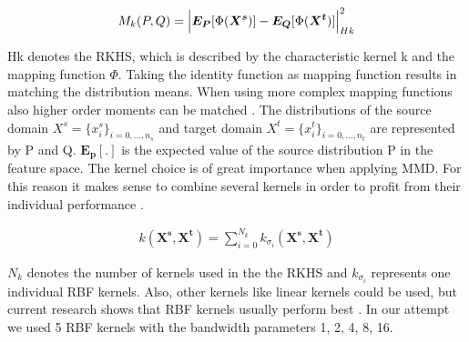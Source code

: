\begin{align}
    M_{k}(P,Q) = \Bigl|  \boldsymbol{E_{P}}[\Phi(\boldsymbol{X^{s}})] - \boldsymbol{E_{Q}}[\Phi(\boldsymbol{X^{t}})]     \Bigl|^{2}_{Hk}
\end{align}

Hk denotes the RKHS, which is described by the characteristic kernel k and the mapping function $\Phi$. Taking the identity function as mapping function results in matching the distribution means. When using more complex mapping functions also higher order moments can be matched \cite{Yujia2015}. The distributions of the source domain $X^{s} = \{{x}_{i}^{s}\}_{i=0,...,n_{s}}$ and target domain $X^{t} = \{{x}_{i}^{t}\}_{i=0,...,n_{t}}$ are represented by P and Q. $\boldsymbol{E_{p}[.]}$ is the expected value of the source distribution P in the feature space. The kernel choice is of great importance when applying MMD. For this reason it makes sense to combine several kernels in order to profit from their individual performance \cite{li2020}.

\begin{align}
    k(\boldsymbol{X^{s}}, \boldsymbol{X^{t}}) = \sum_{i=0}^{N_{k}} k_{\sigma_{i}}(\boldsymbol{X^{s}}, \boldsymbol{X^{t}})
\end{align}

$N_{k}$ denotes the number of kernels used in the the RKHS and $k_{\sigma_{i}}$ represents one individual RBF kernels. Also, other kernels like linear kernels could be used, but current research shows that RBF kernels usually perform best \cite{AZAMFAR2020103932}. In our attempt we used 5 RBF kernels with the bandwidth parameters 1, 2, 4, 8, 16.


